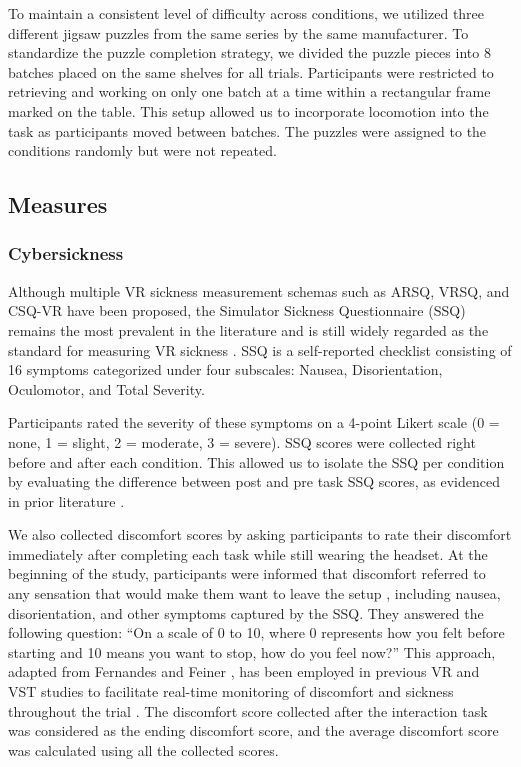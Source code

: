 To maintain a consistent level of difficulty across conditions, we utilized three different jigsaw puzzles from the same series by the same manufacturer. To standardize the puzzle completion strategy, we divided the puzzle pieces into 8 batches placed on the same shelves for all trials. Participants were restricted to retrieving and working on only one batch at a time within a rectangular frame marked on the table. This setup allowed us to incorporate locomotion into the task as participants moved between batches. The puzzles were assigned to the conditions randomly but were not repeated.

\subsection{Measures}
\subsubsection{Cybersickness} 
Although multiple VR sickness measurement schemas such as ARSQ, VRSQ, and CSQ-VR have been proposed, the Simulator Sickness Questionnaire (SSQ) remains the most prevalent in the literature and is still widely regarded as the standard for measuring VR sickness \cite{vinkers2024visual, kourtesis2023cybersickness, kim2018virtual, hussain2023augmented, hirzle2021critical}. SSQ is a self-reported checklist consisting of 16 symptoms categorized under four subscales: Nausea, Disorientation, Oculomotor, and Total Severity. 

Participants rated the severity of these symptoms on a 4-point Likert scale (0 = none, 1 = slight, 2 = moderate, 3 = severe). SSQ scores were collected right before and after each condition. This allowed us to isolate the SSQ per condition by evaluating the difference between post and pre task SSQ scores, as evidenced in prior literature \cite{li2022mixed}. 

We also collected discomfort scores by asking participants to rate their discomfort immediately after completing each task while still wearing the headset. At the beginning of the study, participants were informed that discomfort referred to any sensation that would make them want to leave the setup \cite{fernandes2016combating}, including nausea, disorientation, and other symptoms captured by the SSQ. They answered the following question: “On a scale of 0 to 10, where 0 represents how you felt before starting and 10 means you want to stop, how do you feel now?” This approach, adapted from Fernandes and Feiner \cite{fernandes2016combating}, has been employed in previous VR and VST studies to facilitate real-time monitoring of discomfort and sickness throughout the trial \cite{adhanom2020effect,freiwald2018camera}. The discomfort score collected after the interaction task was considered as the ending discomfort score, and the average discomfort score was calculated using all the collected scores.

